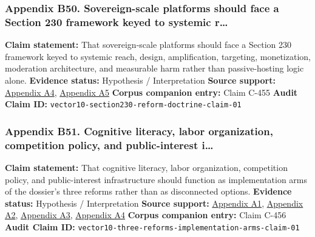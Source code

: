 \documentclass[
  american,
  11pt,
  letterpaper,
]{article}
\begin{document}
\subsubsection{Appendix B50. Sovereign-scale platforms should face a
Section 230 framework keyed to systemic
r\ldots{}}\label{appendix-b50-sovereign-scale-platforms-should-face-a-section-230-framework-keyed-to-systemic-r}

\textbf{Claim statement:} That sovereign-scale platforms should face a
Section 230 framework keyed to systemic reach, design, amplification,
targeting, monetization, moderation architecture, and measurable harm
rather than passive-hosting logic alone. \textbf{Evidence status:}
Hypothesis / Interpretation \textbf{Source support:}
\hyperref[appendix-a4-a-look-behind-the-screens-examining-the-data-practices-of-social-media-and-video-streaming-services]{Appendix
A4},
\hyperref[appendix-a5-social-media-and-youth-mental-health-the-u-s-surgeon-general-s-advisory]{Appendix
A5} \textbf{Corpus companion entry:} Claim C-455 \textbf{Audit Claim
ID:} \texttt{vector10-section230-reform-doctrine-claim-01}

\subsubsection{Appendix B51. Cognitive literacy, labor organization,
competition policy, and public-interest
i\ldots{}}\label{appendix-b51-cognitive-literacy-labor-organization-competition-policy-and-public-interest-i}

\textbf{Claim statement:} That cognitive literacy, labor organization,
competition policy, and public-interest infrastructure should function
as implementation arms of the dossier's three reforms rather than as
disconnected options. \textbf{Evidence status:} Hypothesis /
Interpretation \textbf{Source support:}
\hyperref[appendix-a1-artificial-intelligence-and-the-future-of-teaching-and-learning-insights-and-recommendations]{Appendix
A1},
\hyperref[appendix-a2-in-oxford-handbook-on-ai-governance-the-role-of-workers-in-ai-ethics-and-governance]{Appendix
A2},
\hyperref[appendix-a3-interactions-between-artificial-intelligence-and-digital-public-infrastructure-concepts-benefits-and-challenges]{Appendix
A3},
\hyperref[appendix-a4-a-look-behind-the-screens-examining-the-data-practices-of-social-media-and-video-streaming-services]{Appendix
A4} \textbf{Corpus companion entry:} Claim C-456 \textbf{Audit Claim
ID:} \texttt{vector10-three-reforms-implementation-arms-claim-01}
\end{document}
